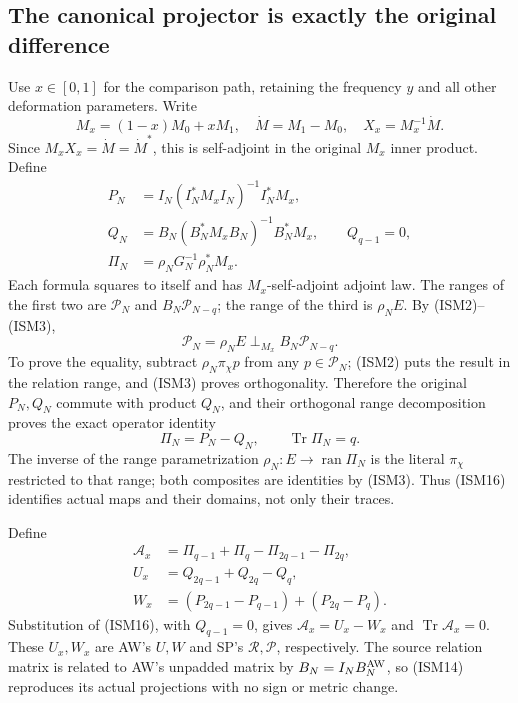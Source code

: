 \subsection{The canonical projector is exactly the original difference}

Use \(x\in[0,1]\) for the comparison path, retaining the
frequency \(y\) and all other deformation parameters.
Write
\[
 M_x=(1-x)M_0+xM_1,\quad \dot M=M_1-M_0,\quad
 X_x=M_x^{-1}\dot M.
 \tag{ISM13}
\]
Since \(M_xX_x=\dot M=\dot M^*\), this is self-adjoint in
the original \(M_x\) inner product.  Define
\[
 \begin{split}
 P_N&=I_N(I_N^*M_xI_N)^{-1}I_N^*M_x,\\
 Q_N&=B_N(B_N^*M_xB_N)^{-1}B_N^*M_x,\qquad Q_{q-1}=0,\\
 \Pi_N&=\rho_NG_N^{-1}\rho_N^*M_x.
 \end{split}
 \tag{ISM14}
\]
Each formula squares to itself and has \(M_x\)-self-adjoint
adjoint law.  The ranges of the first two are
\(\mathcal P_N\) and \(B_N\mathcal P_{N-q}\); the range of
the third is \(\rho_NE\).  By (ISM2)--(ISM3),
\[
 \mathcal P_N=\rho_NE\mathbin{\perp_{M_x}}B_N\mathcal P_{N-q}.
 \tag{ISM15}
\]
To prove the equality, subtract \(\rho_N\pi_\chi p\) from
any \(p\in\mathcal P_N\); (ISM2) puts the result in the
relation range, and (ISM3) proves orthogonality.  Therefore
the original \(P_N,Q_N\) commute with product \(Q_N\), and
their orthogonal range decomposition proves the exact
operator identity
\[
 \Pi_N=P_N-Q_N,\qquad \operatorname{Tr}\Pi_N=q.
 \tag{ISM16}
\]
The inverse of the range parametrization
\(\rho_N:E\to\operatorname{ran}\Pi_N\) is the literal
\(\pi_\chi\) restricted to that range; both composites are
identities by (ISM3).  Thus (ISM16) identifies actual maps
and their domains, not only their traces.

Define
\[
 \begin{split}
 \mathcal A_x&=\Pi_{q-1}+\Pi_q-\Pi_{2q-1}-\Pi_{2q},\\
 U_x&=Q_{2q-1}+Q_{2q}-Q_q,\\
 W_x&=(P_{2q-1}-P_{q-1})+(P_{2q}-P_q).
 \end{split}
 \tag{ISM17}
\]
Substitution of (ISM16), with \(Q_{q-1}=0\), gives
\(\mathcal A_x=U_x-W_x\) and
\(\operatorname{Tr}\mathcal A_x=0\).
These \(U_x,W_x\) are AW's \(U,W\) and SP's
\(\mathcal R,\mathcal P\), respectively.  The source
relation matrix is related to AW's unpadded matrix by
\(B_N=I_NB_N^{\rm AW}\), so (ISM14) reproduces its
actual projections with no sign or metric change.

